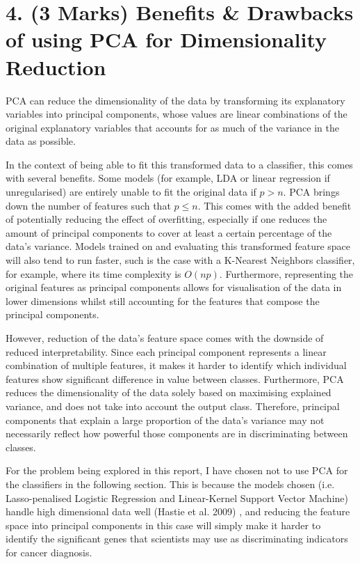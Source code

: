 \documentclass[twocolumn]{article}
\begin{document}
\section{4. (3 Marks) Benefits \& Drawbacks of using PCA for Dimensionality Reduction}
PCA can reduce the dimensionality of the data by transforming its explanatory variables into principal components, whose values are linear combinations of the original explanatory variables that accounts for as much of the variance in the data as possible. 

In the context of being able to fit this transformed data to a classifier, this comes with several benefits. Some models (for example, LDA or linear regression if unregularised) are entirely unable to fit the original data if $p>n$. PCA brings down the number of features such that $p \le n$. This comes with the added benefit of potentially reducing the effect of overfitting, especially if one reduces the amount of principal components to cover at least a certain percentage of the data's variance. Models trained on and evaluating this transformed feature space will also tend to run faster, such is the case with a K-Nearest Neighbors classifier, for example, where its time complexity is $O(np)$. Furthermore, representing the original features as principal components allows for visualisation of the data in lower dimensions whilst still accounting for the features that compose the principal components.

However, reduction of the data's feature space comes with the downside of reduced interpretability. Since each principal component represents a linear combination of multiple features, it makes it harder to identify which individual features show significant difference in value between classes. Furthermore, PCA reduces the dimensionality of the data solely based on maximising explained variance, and does not take into account the output class. Therefore, principal components that explain a large proportion of the data's variance may not necessarily reflect how powerful those components are in discriminating between classes.

For the problem being explored in this report, I have chosen not to use PCA for the classifiers in the following section. This is because the models chosen (i.e. Lasso-penalised Logistic Regression and Linear-Kernel Support Vector Machine) handle high dimensional data well (Hastie et al. 2009) \cite{HastieTrevor2009EoSL}, and reducing the feature space into principal components in this case will simply make it harder to identify the significant genes that scientists may use as discriminating indicators for cancer diagnosis.
\end{document}
